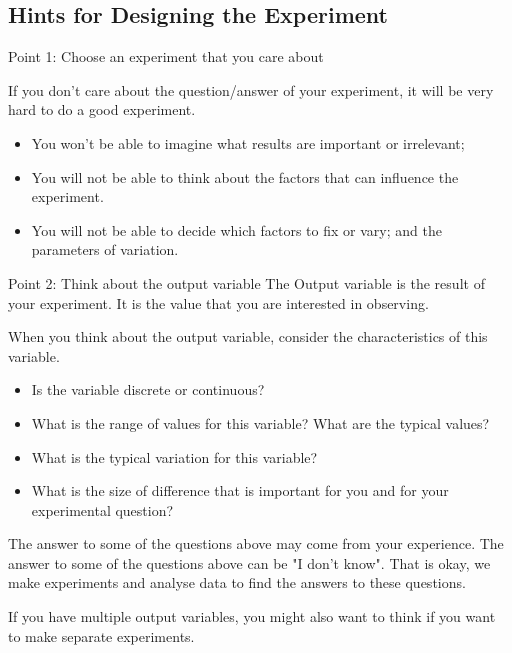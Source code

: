 \subsection{Hints for Designing the Experiment}

\begin{frame}{Point 1: Choose an experiment that you care about}

  If you don't care about the question/answer of your experiment, it will be very hard to do a good experiment.\bigskip

  \begin{itemize}
    \item You won't be able to imagine what results are important or irrelevant;
    \item You will not be able to think about the factors that can influence the experiment.
    \item You will not be able to decide which factors to fix or vary; and the parameters of variation.
  \end{itemize}
\end{frame}

\begin{frame}{Point 2: Think about the output variable}
  The Output variable is the result of your experiment. It is the value that you are interested in observing.\bigskip

  When you think about the output variable, consider the characteristics of this variable.\bigskip

  \begin{itemize}
    \item Is the variable discrete or continuous?
    \item What is the range of values for this variable? What are the typical values?
    \item What is the typical variation for this variable?
    \item What is the size of difference that is important for you and for your experimental question?
  \end{itemize}\bigskip

  The answer to some of the questions above may come from your experience. The answer to some of the questions above can be "I don't know".
  That is okay, we make experiments and analyse data to find the answers to these questions.\bigskip

  If you have multiple output variables, you might also want to think if you want to make separate experiments.
\end{frame}

